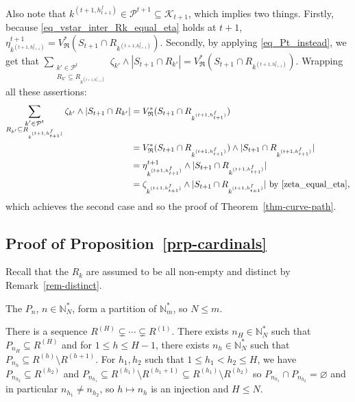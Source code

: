 \documentclass[
  11pt,
  a4paper,
]{article}
\theoremstyle{plain}
\theoremstyle{plain}
\theoremstyle{definition}
\theoremstyle{plain}
\theoremstyle{definition}
\theoremstyle{remark}
\begin{document}
Also note that
\(k^{(t+1,h^f_{t+1})}\in\mathcal{P}^{t+1}\subseteq\mathcal{K}_{t+1}\),
which implies two things. Firstly, because
\eqref{eq_vstar_inter_Rk_equal_eta} holds at \(t+1\),
\(\eta^{t+1}_{k^{(t+1,h^f_{t+1})} }=V^*_{\mathfrak{R}}( S_{t+1}\cap  R_{  k^{(t+1,h^f_{t+1})}  } )\).
Secondly, by applying \eqref{eq_Pt_instead}, we get that
\(\sum_{\substack{k'\in\mathcal{P}^{t}\\R_{k'}\subseteq  R_{  k^{(t+1,h^f_{t+1})}} }} \zeta_{k'}\wedge |S_{t+1}\cap R_{k'}| = V^*_{\mathfrak{R}}( S_{t+1}\cap  R_{  k^{(t+1,h^f_{t+1})}  } )\).
Wrapping all these assertions: \begin{align*}
\sum_{\substack{k'\in\mathcal{P}^{t}\\R_{k'}\subseteq  R_{  k^{(t+1,h^f_{t+1})}} }} \zeta_{k'}\wedge |S_{t+1}\cap R_{k'}| &= V^*_{\mathfrak{R}}( S_{t+1}\cap  R_{  k^{(t+1,h^f_{t+1})}  } )\\
&=V^*_{\mathfrak{R}}( S_{t+1}\cap  R_{  k^{(t+1,h^f_{t+1})}  } )\wedge  |S_{t+1}\cap R_{ k^{(t+1,h^f_{t+1})}}|\\
&=\eta^{t+1}_{k^{(t+1,h^f_{t+1})} }\wedge  |S_{t+1}\cap R_{ k^{(t+1,h^f_{t+1})}}|\\
&=  \zeta_{ k^{(t+1,h^f_{t+1})}}\wedge |S_{t+1}\cap R_{ k^{(t+1,h^f_{t+1})}}| \text{ by \eqref{zeta_equal_eta}},
\end{align*} which achieves the second case and so the proof of
Theorem~\ref{thm-curve-path}.

\subsection{\texorpdfstring{Proof of
Proposition~\ref{prp-cardinals}}{Proof of Proposition~}}\label{sec-cardinals}

Recall that the \(R_k\) are assumed to be all non-empty and distinct by
Remark~\ref{rem-distinct}.

The \(P_n\), \(n\in \mathbb N_N^*\), form a partition of
\(\mathbb{N}_m^*\), so \(N\leq m\).

There is a sequence \(R^{(H)}\subsetneq\dotsb\subsetneq R^{(1)}\). There
exists \(n_H\in\mathbb N_N^*\) such that \(P_{n_H}\subseteq R^{(H)}\)
and for \(1\leq h \leq H-1\), there exists \(n_h\in\mathbb N_N^*\) such
that \(P_{n_h}\subseteq R^{(h)}\setminus R^{(h+1)}\). For \(h_1, h_2\)
such that \(1\leq h_1<h_2 \leq H\), we have
\(P_{n_{h_2}}\subseteq R^{(h_2)}\) and
\(P_{n_{h_1}}\subseteq R^{(h_1)}\setminus R^{(h_1+1)}\subseteq R^{(h_1)}\setminus R^{(h_2)}\)
so \(P_{n_{h_1}}\cap P_{n_{h_2}}=\varnothing\) and in particular
\(n_{h_1}\neq n_{h_2}\), so \(h\mapsto n_h\) is an injection and
\(H\leq N\).
\end{document}
